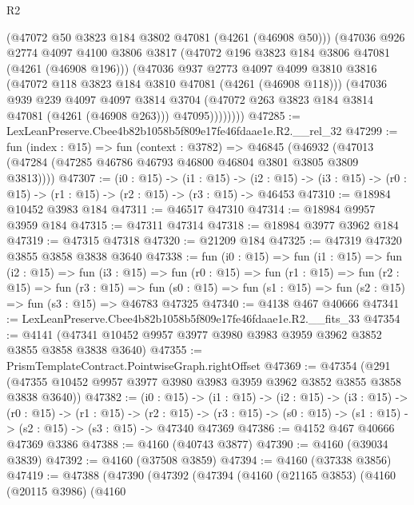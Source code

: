 \begin{lexlean}{R2}
\begin{coremodule}
              (@47072 @50 @3823 @184 @3802 @47081 (@4261 (@46908 @50)))
              (@47036
                @926
                @2774
                @4097
                @4100
                @3806
                @3817
                (@47072 @196 @3823 @184 @3806 @47081 (@4261 (@46908 @196)))
                (@47036
                  @937
                  @2773
                  @4097
                  @4099
                  @3810
                  @3816
                  (@47072 @118 @3823 @184 @3810 @47081 (@4261 (@46908 @118)))
                  (@47036
                    @939
                    @239
                    @4097
                    @4097
                    @3814
                    @3704
                    (@47072 @263 @3823 @184 @3814 @47081 (@4261 (@46908 @263)))
                    @47095))))))))
@47285 := LexLeanPreserve.Cbee4b82b1058b5f809e17fe46fdaae1e.R2.__rel_32
@47299 := fun (index : @15) =>
  fun (context : @3782) =>
  @46845 (@46932 (@47013 (@47284 (@47285 @46786 @46793 @46800 @46804 @3801 @3805 @3809 @3813))))
@47307 := (i0 : @15) ->
  (i1 : @15) ->
  (i2 : @15) -> (i3 : @15) -> (r0 : @15) -> (r1 : @15) -> (r2 : @15) -> (r3 : @15) -> @46453
@47310 := @18984 @10452 @3983 @184
@47311 := @46517 @47310
@47314 := @18984 @9957 @3959 @184
@47315 := @47311 @47314
@47318 := @18984 @3977 @3962 @184
@47319 := @47315 @47318
@47320 := @21209 @184
@47325 := @47319 @47320 @3855 @3858 @3838 @3640
@47338 := fun (i0 : @15) =>
  fun (i1 : @15) =>
  fun (i2 : @15) =>
  fun (i3 : @15) =>
  fun (r0 : @15) =>
  fun (r1 : @15) =>
  fun (r2 : @15) =>
  fun (r3 : @15) =>
  fun (s0 : @15) => fun (s1 : @15) => fun (s2 : @15) => fun (s3 : @15) => @46783 @47325
@47340 := @4138 @467 @40666
@47341 := LexLeanPreserve.Cbee4b82b1058b5f809e17fe46fdaae1e.R2.__fits_33
@47354 := @4141 (@47341 @10452 @9957 @3977 @3980 @3983 @3959 @3962 @3852 @3855 @3858 @3838 @3640)
@47355 := PrismTemplateContract.PointwiseGraph.rightOffset
@47369 := @47354
    (@291 (@47355 @10452 @9957 @3977 @3980 @3983 @3959 @3962 @3852 @3855 @3858 @3838 @3640))
@47382 := (i0 : @15) ->
  (i1 : @15) ->
  (i2 : @15) ->
  (i3 : @15) ->
  (r0 : @15) ->
  (r1 : @15) ->
  (r2 : @15) -> (r3 : @15) -> (s0 : @15) -> (s1 : @15) -> (s2 : @15) -> (s3 : @15) -> @47340 @47369
@47386 := @4152 @467 @40666 @47369 @3386
@47388 := @4160 (@40743 @3877)
@47390 := @4160 (@39034 @3839)
@47392 := @4160 (@37508 @3859)
@47394 := @4160 (@37338 @3856)
@47419 := @47388
    (@47390
      (@47392
        (@47394
          (@4160
            (@21165 @3853)
            (@4160
              (@20115 @3986)
              (@4160

\end{coremodule}
\end{lexlean}
